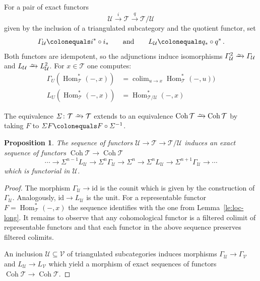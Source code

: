 \documentclass{amsart}[a4]
\newtheorem{proposition}[theorem]{Proposition}
\theoremstyle{definition}
\theoremstyle{remark}
\numberwithin{equation}{section}
\newcommand{\Coh}{\operatorname{Coh}}
\newcommand{\colim}{\operatorname{colim}}
\newcommand{\Hom}{\operatorname{Hom}}
\newcommand{\iso}{\xrightarrow{\raisebox{-.6ex}[0ex][0ex]{$\scriptstyle{\sim}$}}}
\newcommand{\lto}{\longrightarrow}
\newcommand{\id}{\mathrm{id}}
\newcommand{\cat}{\mathcal}
\newcommand{\Si}{\Sigma}
\let\Gamma\varGamma
\let\Sigma\varSigma
\begin{document}
For a pair of exact functors
\[\cat U\xrightarrow{\ i\ }\cat T\xrightarrow{\ q\ }\cat T/\cat U\]
given by the inclusion of a triangulated subcategory and the quotient
functor, set
\[\Gamma_\cat U\colonequals i^*\circ i_*\qquad\text{and}\qquad L_\cat
  U\colonequals q_*\circ q^*\,.\] Both functors are idempotent, so the
adjunctions induce isomorphisms $\Gamma_\cat U^2 \iso \Gamma_\cat U$
and $L_\cat U\iso L^2_\cat U$.  For $x\in\cat T$ one computes:
\begin{align*}
  \Gamma_U(\Hom^*_\cat T(-,x))&=\colim_{u\to x}\Hom^*_\cat
                               T(-,u))\\
  L_U(\Hom^*_\cat T(-,x))&=\Hom^*_{\cat
                           T/\cat U}(-,x)
\end{align*}


The equivalence $\Si\colon \cat T\iso\cat T$ extends to an equivalence
$\Coh\cat T\iso\Coh\cat T$ by taking $F$ to
$\Si F\colonequals F\circ \Si^{-1}$.

\begin{proposition}
  The sequence of functors $\cat U\to\cat T\to\cat T/\cat U$
  induces an exact sequence of functors $\Coh\cat
T\to\Coh\cat T$
\begin{equation}\label{eq:coh-loc-seq}
 \cdots \lto\Si^{n-1} L_\cat U\lto \Si^n\Gamma_\cat U\lto \Si^n\lto
  \Si^nL_\cat U\lto \Si^{n+1}\Gamma_\cat U\lto\cdots
\end{equation}
which is functorial in $\cat U$.
\end{proposition}
\begin{proof}
  The morphism $\Gamma_\cat U\to\id$ is the counit which is given by
  the construction of $\Gamma_\cat U$. Analogously, $\id\to L_\cat U$
  is the unit.  For a representable functor $F=\Hom^*_{\cat T}(-,x)$ the
  sequence identifies with the one from Lemma~\ref{le:loc-long}. It
  remains to observe that any cohomological functor is a filtered
  colimit of representable functors and that each functor in the above
  sequence preserves filtered colimits.

  An inclusion $\cat U\subseteq\cat V$ of triangulated subcategories
  induces morphisms $\Gamma_\cat U\to \Gamma_\cat V$ and
  $L_\cat U\to L_\cat V$ which yield a morphism of exact sequences of
  functors $\Coh\cat T\to\Coh\cat T$.
\end{proof}
\end{document}

